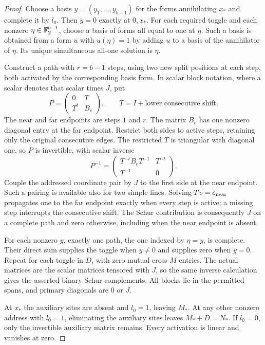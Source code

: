 \begin{proof}
Choose a basis $y=(y_1,\ldots,y_{b-1})$ for the forms annihilating
$x_*$ and complete it by $l_0$. Then $y=0$ exactly at $0,x_*$.
For each required toggle and each nonzero $\eta\in\mathbb F_2^{b-1}$,
choose a basis of forms all equal to one at $\eta$. Such a basis is
obtained from a form $u$ with $u(\eta)=1$ by adding $u$ to a basis
of the annihilator of $\eta$. Its unique simultaneous all-one
solution is $\eta$.

Construct a path with $r=b-1$ steps, using two new split positions at
each step, both activated by the corresponding basis form. In scalar
block notation, where a scalar denotes that scalar times $J$, put
\begin{equation}\label{eq:lm:path-matrix}
 P=\begin{pmatrix}0&T\\T^t&B_e\end{pmatrix},
 \qquad T=I+\text{lower consecutive shift}.
\end{equation}
The near and far endpoints are steps $1$ and $r$. The matrix $B_e$
has one nonzero diagonal entry at the far endpoint. Restrict both sides
to active steps, retaining only the original consecutive edges. The
restricted $T$ is triangular
with diagonal one, so $P$ is invertible, with scalar inverse
\[
 P^{-1}=\begin{pmatrix}
 T^{-t}B_eT^{-1}&T^{-t}\\T^{-1}&0
 \end{pmatrix}.
\]
Couple the addressed coordinate pair by $J$ to the first side at the
near endpoint. Such a pairing is available also for two simple lines.
Solving $Tv=e_{\rm near}$ propagates one to the far endpoint exactly
when every step is active; a missing step interrupts the consecutive
shift. The Schur contribution is consequently $J$ on a complete path
and zero otherwise, including when the near endpoint is absent.

For each nonzero $y$, exactly one path, the one indexed by $\eta=y$,
is complete. Their direct sum supplies the toggle when $y\ne0$ and
supplies zero when $y=0$. Repeat for each toggle in $D$, with zero
mutual cross-$M$ entries. The actual matrices are the scalar matrices
tensored with $J$, so the same inverse calculation gives the asserted
binary Schur complements. All blocks lie in the permitted spans, and
primary diagonals are $0$ or $J$.

At $x_*$ the auxiliary sites are absent and $l_0=1$, leaving $M_*$.
At any other nonzero address with $l_0=1$, eliminating the auxiliary
sites leaves $M_*+D=N_*$. If $l_0=0$, only the invertible auxiliary
matrix remains. Every activation is linear and vanishes at zero.
\end{proof}
